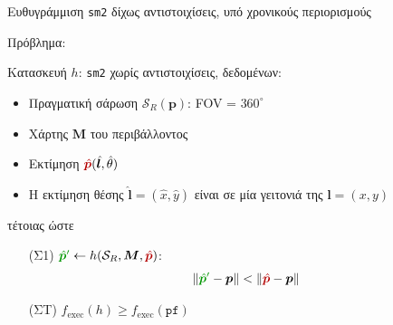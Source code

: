 \begin{frame}{Ευθυγράμμιση \texttt{sm2} δίχως αντιστοιχίσεις, υπό χρονικούς περιορισμούς}




  Πρόβλημα:\\
  \vspace{0.5cm}

  Κατασκευή $h$: \texttt{sm2} χωρίς αντιστοιχίσεις, δεδομένων:
  \begin{itemize}
    \item Πραγματική σάρωση $\mathcal{S}_R(\bm{p})$: FOV = $360^\circ$
    \item Χάρτης $\bm{M}$ του περιβάλλοντος
    \item Εκτίμηση $\textcolor{r}{\hat{\bm{p}}}(\hat{\bm{l}}, \hat{\theta})$
    \item Η εκτίμηση θέσης $\hat{\bm{l}} = (\hat{x},\hat{y})$ είναι σε μία γειτονιά της $\bm{l} = (x,y)$
  \end{itemize}

  \vspace{0.5cm}
  τέτοιας ώστε
  \begin{itemize}
    \item[(Σ1)] $\textcolor{g}{\hat{\bm{p}}^\prime} \leftarrow h(\mathcal{S}_R, \bm{M}, \textcolor{r}{\hat{\bm{p}}})$:
          \begin{align}
            \|\textcolor{g}{\hat{\bm{p}}^\prime} - \bm{p}\| < \|\textcolor{r}{\hat{\bm{p}}} - \bm{p}\| \nonumber
          \end{align}
    \item[(ΣΤ)] $f_{\text{exec}}(h) \geq f_{\text{exec}}(\texttt{pf})$
  \end{itemize}






\end{frame}
